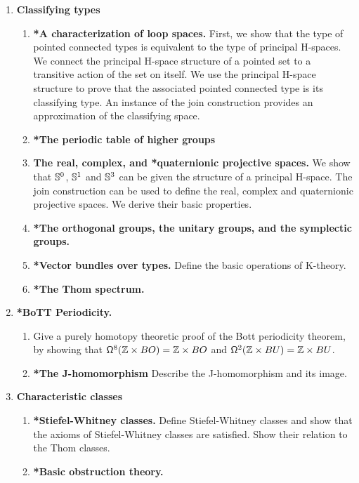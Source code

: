 \documentclass[reqno]{amsart}
\begin{document}
\begin{enumerate}[label=\arabic*.]
\begin{enumerate}[label*=\arabic*.]
\end{enumerate}
\item \textbf{Classifying types}
\begin{enumerate}[label*=\arabic*.]
\item \textbf{*A characterization of loop spaces.} First, we show that the type of pointed connected types is equivalent to the type of principal H-spaces. We connect the principal H-space structure of a pointed set to a transitive action of the set on itself. We use the principal H-space structure to prove that the associated pointed connected type is its classifying type. An instance of the join construction provides an approximation of the classifying space.
\item \textbf{*The periodic table of higher groups}
\item \textbf{The real, complex, and *quaternionic projective spaces.} We show that $\sphere{0}$, $\sphere{1}$ and $\sphere{3}$ can be given the structure of a principal H-space. The join construction can be used to define the real, complex and quaternionic projective spaces. We derive their basic properties.
\item \textbf{*The orthogonal groups, the unitary groups, and the symplectic groups.}
\item \textbf{*Vector bundles over types.} Define the basic operations of K-theory.
\item \textbf{*The Thom spectrum.}
\end{enumerate}
\item \textbf{*BoTT Periodicity.} 
\begin{enumerate}[label*=\arabic*.]
\item Give a purely homotopy theoretic proof of the
Bott periodicity theorem, by showing that $\loopspace[8]{\Z\times BO}=\Z\times BO$
and $\loopspace[2]{\Z\times BU}=\Z\times BU$.
\item \textbf{*The J-homomorphism} Describe the J-homomorphism and its image.
\end{enumerate}
\item \textbf{Characteristic classes}
\begin{enumerate}[label*=\arabic*.]
\item \textbf{*Stiefel-Whitney classes.} Define Stiefel-Whitney classes and show that the axioms of Stiefel-Whitney classes are satisfied. Show their relation to the Thom classes.
\item \textbf{*Basic obstruction theory.}
\end{enumerate}
\end{enumerate}
\end{document}
